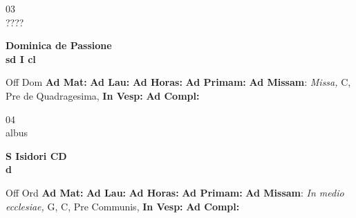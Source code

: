 \documentclass[10pt, openany]{book}
\begin{document}
    \begin{center}
        \begin{minipage}{3.5in}
            \vspace{2em}
            \begin{minipage}{0.5in}
                {\Huge 03} \\
                {\normalsize ????}
            \end{minipage}
            \begin{minipage}{3.0in}
                \textbf{ \large Dominica de Passione \\
                \textnormal{\normalsize sd I cl}}

            \end{minipage}
            \begin{justify}Off Dom
                \textbf{Ad Mat: }
                \textbf{Ad Lau: }
                \textbf{Ad Horas: }
                \textbf{Ad Primam: }\textbf{Ad Missam}: \textit{Missa,} C, Pre de Quadragesima, 
                \textbf{In Vesp: }
                \textbf{Ad Compl: }
            \end{justify}
        \end{minipage}
    \end{center}

    \begin{center}
        \begin{minipage}{3.5in}
            \vspace{2em}
            \begin{minipage}{0.5in}
                {\Huge 04} \\
                {\normalsize albus}
            \end{minipage}
            \begin{minipage}{3.0in}
                \textbf{ \large S Isidori CD \\
                \textnormal{\normalsize d}}

            \end{minipage}
            \begin{justify}Off Ord
                \textbf{Ad Mat: }
                \textbf{Ad Lau: }
                \textbf{Ad Horas: }
                \textbf{Ad Primam: }\textbf{Ad Missam}: \textit{In medio ecclesiae,} G, C, Pre Communis, 
                \textbf{In Vesp: }
                \textbf{Ad Compl: }
            \end{justify}
        \end{minipage}
    \end{center}
\end{document}
